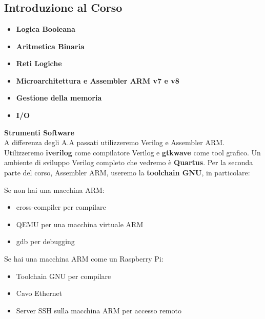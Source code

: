 \part{}
\chapter{Introduzione al Corso}

\begin{itemize}
	\item{\textbf{Logica Booleana}}
	\item{\textbf{Aritmetica Binaria}}
	\item{\textbf{Reti Logiche}}
	\item{\textbf{Microarchitettura e Assembler ARM v7 e v8}}
	\item{\textbf{Gestione della memoria}}
	\item{\textbf{I/O}}
\end{itemize}


\begin{defn}
	\textbf{Strumenti Software} \\

	A differenza degli A.A passati utilizzeremo Verilog e Assembler ARM.
	Utilizzeremo \textbf{iverilog} come compilatore Verilog e \textbf{gtkwave} come tool grafico. Un ambiente di sviluppo Verilog completo che vedremo è \textbf{Quartus}.
	Per la seconda parte del corso, Assembler ARM, useremo la \textbf{toolchain GNU}, in particolare:
	
	
	\subparagraph{Se non hai una macchina ARM:}
	\begin{itemize}
		\item{cross-compiler per compilare}
		\item{QEMU per una macchina virtuale ARM}
		\item{gdb per debugging}
	\end{itemize}
	
	\subparagraph{Se hai una macchina ARM come un Raspberry Pi:}
	\begin{itemize}
		\item{Toolchain GNU per compilare}
		\item{Cavo Ethernet}
		\item{Server SSH sulla macchina ARM per accesso remoto}
	\end{itemize}
\end{defn}


